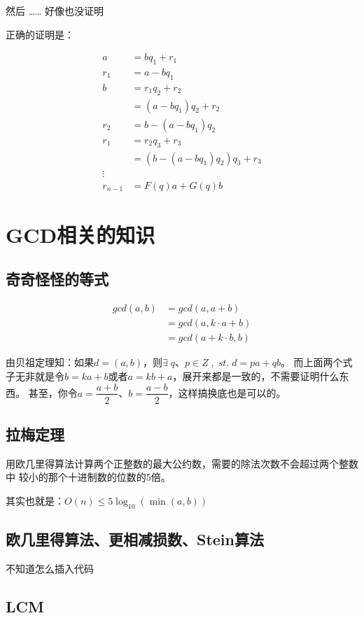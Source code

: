 \documentclass[12pt]{article}
\begin{document}
然后 …… 好像也没证明

正确的证明是：

\begin{align}
    a &= bq_{1} + r_{1} \\
    r_{1} &= a - bq_{1} \\
    b &= r_{1}q_{2} + r_{2} \\ \nonumber &= (a - bq_{1})q_{2} + r_{2} \\
    r_{2} &= b - (a - bq_{1})q_{2}\\
    r_{1} &= r_{2}q_{3} + r_{3} \\ \nonumber &= (b - (a - bq_{1})q_{2})q_{3} + r_{3}\\
    \vdots\nonumber \\
    r_{n-1}&=F(q)a+G(q)b
\end{align}

\section{GCD相关的知识}
\subsection{奇奇怪怪的等式}
\begin{align}
    gcd(a,b) &=gcd(a,a+b)\nonumber \\
    &=gcd(a,k\cdot a+b)\nonumber  \\ 
    &=gcd(a+k\cdot b,b)\nonumber
\end{align}

由贝祖定理知：如果$d = (a,b)$，则$\exists\;q、p\in Z \;,\;st.\;d=pa+qb$。
而上面两个式子无非就是令$b=ka+b$或者$a=kb+a$，展开来都是一致的，不需要证明什么东西。
甚至，你令$a=\dfrac{a+b}{2}$、$b=\dfrac{a-b}{2}$，这样搞换底也是可以的。


\subsection{拉梅定理}
用欧几里得算法计算两个正整数的最大公约数，需要的除法次数不会超过两个整数中
较小的那个十进制数的位数的5倍。

其实也就是：$O(n)\leq 5\log_{10}(\min (a,b))$

\subsection{欧几里得算法、更相减损数、Stein算法}

不知道怎么插入代码

\subsection{LCM}
\end{document}
